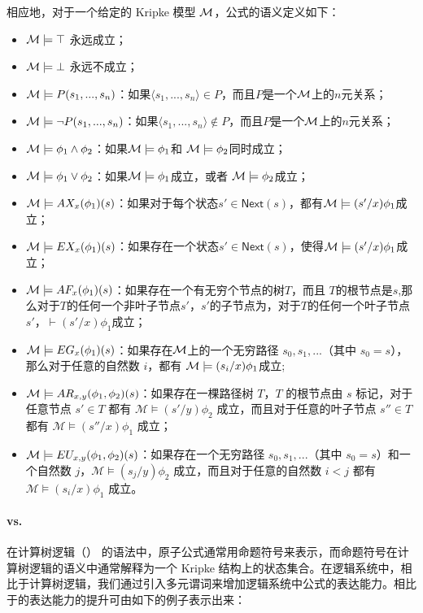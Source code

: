相应地，对于一个给定的 Kripke 模型 $\cal M$，公式的语义定义如下：
\begin{itemize}
	\item ${\cal M}\models \top$ 永远成立；
	\item ${\cal M}\models \bot$ 永远不成立；
	\item ${\cal M}\models P(s_1,...,s_n)$：如果$\langle s_1,...,s_n\rangle\in P$，而且$P$是一个$\cal M$上的$n$元关系；
	\item ${\cal M}\models \neg P(s_1,...,s_n)$：如果$\langle s_1,...,s_n\rangle\notin P$，而且$P$是一个$\cal M$上的$n$元关系；
	\item ${\cal M}\models \phi_1\wedge\phi_2$：如果${\cal M}\models \phi_1$和 ${\cal M}\models \phi_2$同时成立；
	\item ${\cal M}\models \phi_1\vee\phi_2$：如果${\cal M}\models \phi_1$成立，或者 ${\cal M}\models \phi_2$成立；
	\item ${\cal M}\models AX_x(\phi_1)(s)$：如果对于每个状态$s'\in\textsf{Next}(s)$，都有${\cal M}\models (s'/x)\phi_1$成立；
	\item ${\cal M}\models EX_x(\phi_1)(s)$：如果存在一个状态$s'\in\textsf{Next}(s)$，使得${\cal M}\models (s'/x)\phi_1$成立；
	\item ${\cal M}\models AF_x(\phi_1)(s)$：如果存在一个有无穷个节点的树$T$，而且 $T$的根节点是$s$,那么对于$T$的任何一个非叶子节点$s'$，$s'$的子节点为，对于$T$的任何一个叶子节点$s'$，$\vdash (s'/x)\phi_1$成立；
	\item ${\cal M}\models EG_x(\phi_1)(s)$：如果存在$\cal M$上的一个无穷路径 $s_0,s_1,...$（其中 $s_0 = s$），那么对于任意的自然数 $i$，都有 ${\cal M}\models (s_i/x)\phi_1$成立;
	\item ${\cal M}\models AR_{x, y}(\phi_1,\phi_2)(s)$：如果存在一棵路径树 $T$，$T$ 的根节点由 $s$ 标记，对于任意节点 $s'\in T$ 都有 $\mathcal{M}\models (s'/y)\phi_2$ 成立，而且对于任意的叶子节点 $s''\in T$ 都有 $\mathcal{M}\models (s''/x)\phi_1$ 成立；
	\item ${\cal M}\models EU_{x, y}(\phi_1,\phi_2)(s)$：如果存在一个无穷路径 $s_0,s_1,...$（其中 $s_0=s$）和一个自然数 $j$，$\mathcal{M}\models(s_j/y)\phi_2$ 成立，而且对于任意的自然数 $i<j$ 都有 $\mathcal{M}\models (s_i/x)\phi_1$ 成立。
\end{itemize}


\paragraph{\CTL{} vs. \CTLP{}}在计算树逻辑（\CTL）\cite{EmersonC82,EmersonH85} 的语法中，原子公式通常用命题符号来表示，而命题符号在计算树逻辑的语义中通常解释为一个 Kripke 结构上的状态集合。在逻辑系统\CTLP{}中，相比于计算树逻辑，我们通过引入多元谓词来增加逻辑系统中公式的表达能力。\CTLP{}相比于\CTL{}的表达能力的提升可由如下的例子表示出来：

